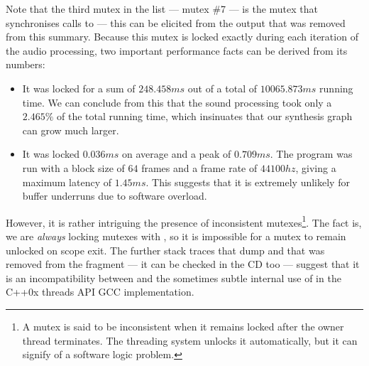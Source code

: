 Note that the third mutex in the list --- mutex \#7 --- is the mutex
that synchronises calls to  --- this can be
elicited from the  output that was removed from this
summary. Because this mutex is locked exactly during each iteration of
the audio processing, two important performance facts can be derived
from its numbers:
\begin{itemize}
\item It was locked for a sum of $248.458 ms$ out of a total of
  $10065.873 ms$ running time. We can conclude from this that the
  sound processing took only a $2.465\%$ of the total running time,
  which insinuates that our synthesis graph can grow much larger.
\item It was locked $0.036 ms$ on average and a peak of $0.709
  ms$. The program was run with a block size of $64$ frames and a
  frame rate of $44100 hz$, giving a maximum latency of $1.45 ms$. This
  suggests that it is extremely unlikely for buffer underruns due to
  software overload.
\end{itemize}

However, it is rather intriguing the presence of inconsistent
mutexes\footnote{A mutex is said to be inconsistent when it remains
  locked after the owner thread terminates. The threading system
  unlocks it automatically, but it can signify of a software logic
  problem.}. The fact is, we are \emph{always} locking mutexes with
, so it is impossible for a mutex to remain
unlocked on scope exit. The further stack traces that 
dump and that was removed from the fragment --- it can be checked in
the CD too --- suggest that it is an incompatibility between
 and the sometimes subtle internal use of
 in the C++0x threads API GCC implementation.

